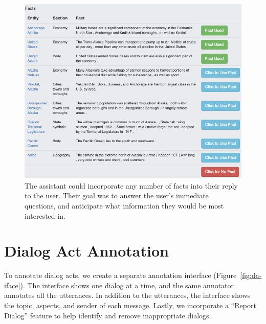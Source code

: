 \begin{figure}[ht]
    \centering
    \begin{minipage}{\textwidth}
        \includegraphics[width=\linewidth]{2020_emnlp_curiosity/figures/fact-bank}
    \end{minipage}
    \begin{minipage}{\textwidth}
    \end{minipage}

    \caption{
        The assistant could incorporate any number of facts into their reply to the user.
        Their goal was to answer the user's immediate questions, and anticipate what information they would be most interested in.
    }
    \label{fig:grounded-msg}
\end{figure}

\section{Dialog Act Annotation}
\label{apx:acts}
To annotate dialog acts, we create a separate annotation interface (Figure~\ref{fig:da-iface}).
The interface shows one dialog at a time, and the same annotator annotates all the utterances.
In addition to the utterances, the interface shows the topic, aspects, and sender of each message.
Lastly, we incorporate a ``Report Dialog'' feature to help identify and remove inappropriate dialogs.

